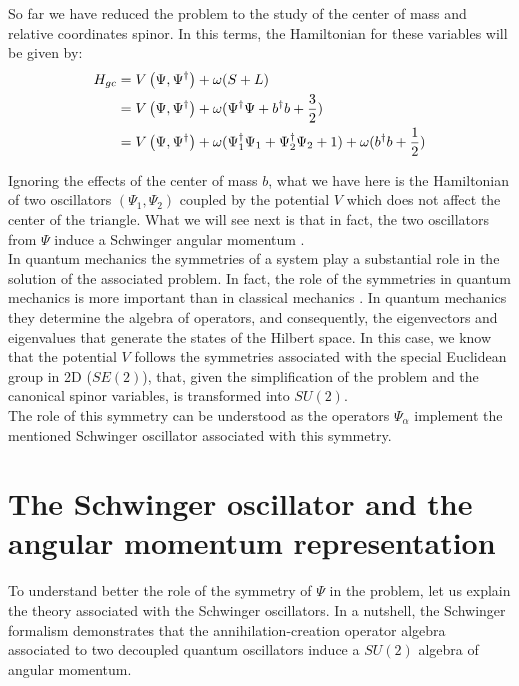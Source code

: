 
So far we have reduced the problem to the study of the center of mass and relative coordinates spinor. In this terms, the Hamiltonian for these variables will be given by:\\

\begin{align*}
H_{gc} &= V\left( \Psi,\Psi^\dagger \right)+ \omega (S+L)\\
&= V\left( \Psi,\Psi^\dagger \right) + \omega(\Psi^\dagger\Psi + b^\dagger b +\frac{3}{2})\\
&= V\left( \Psi,\Psi^\dagger \right) + \omega(\Psi_1^\dagger\Psi_1 +\Psi_2^\dagger\Psi_2+ 1) +\omega(b^\dagger b +\frac{1}{2})
\end{align*}

Ignoring the effects of the center of mass $b$, what we have here is the Hamiltonian of two oscillators $(\Psi_1,\Psi_2)$ coupled by the potential $V$ which does not affect the center of the triangle. What we will see next is that in fact, the two oscillators from $\Psi$ induce a Schwinger angular momentum \cite{Schwinger}.\\

In quantum mechanics the symmetries of a system play a substantial role in the solution of the associated problem. In fact, the role of the symmetries in quantum mechanics is more important than in classical mechanics \cite{qfhebook}. In quantum mechanics they determine the algebra of operators, and consequently, the eigenvectors and eigenvalues that generate the states of the Hilbert space. In this case, we know that the potential $V$ follows the symmetries associated with the special Euclidean group in 2D ($SE(2)$), that, given the simplification of the problem and the canonical spinor variables, is transformed into $SU(2)$.\\

The role of this symmetry can be understood as the operators $\Psi_\alpha$ implement the mentioned Schwinger oscillator \cite{Schwinger} associated with this symmetry.\\

\section{The Schwinger oscillator and the angular momentum representation}
To understand better the role of the symmetry of $\Psi$ in the problem, let us explain the theory associated with the Schwinger oscillators. In a nutshell, the Schwinger formalism demonstrates that the annihilation-creation operator algebra associated to two decoupled quantum oscillators induce a $SU(2)$ algebra of angular momentum.\\

